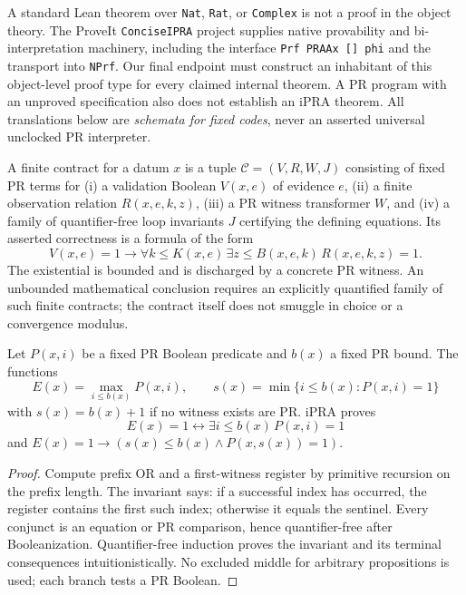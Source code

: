 \documentclass[11pt]{article}
\begin{document}
A standard Lean theorem over \texttt{Nat}, \texttt{Rat}, or \texttt{Complex} is not a proof in the object theory. The ProveIt \texttt{ConciseIPRA} project supplies native provability and bi-interpretation machinery, including the interface \texttt{Prf PRAAx [] phi} and the transport into \texttt{NPrf}. Our final endpoint must construct an inhabitant of this object-level proof type for every claimed internal theorem. A PR program with an unproved specification also does not establish an iPRA theorem. All translations below are \emph{schemata for fixed codes}, never an asserted universal unclocked PR interpreter.

\begin{definition}
A finite contract for a datum $x$ is a tuple $\mathcal C=(V,R,W,J)$ consisting of fixed PR terms for (i) a validation Boolean $V(x,e)$ of evidence $e$, (ii) a finite observation relation $R(x,e,k,z)$, (iii) a PR witness transformer $W$, and (iv) a family of quantifier-free loop invariants $J$ certifying the defining equations. Its asserted correctness is a formula of the form
\[V(x,e)=1\to \forall k\le K(x,e)\,\exists z\le B(x,e,k)\,R(x,e,k,z)=1.\]
The existential is bounded and is discharged by a concrete PR witness. An unbounded mathematical conclusion requires an explicitly quantified family of such finite contracts; the contract itself does not smuggle in choice or a convergence modulus.
\end{definition}

\begin{lemma}
Let $P(x,i)$ be a fixed PR Boolean predicate and $b(x)$ a fixed PR bound. The functions
\[E(x)=\max_{i\le b(x)}P(x,i),\qquad s(x)=\min\{i\le b(x):P(x,i)=1\}\]
with $s(x)=b(x)+1$ if no witness exists are PR. iPRA proves
\[E(x)=1\leftrightarrow\exists i\le b(x)\,P(x,i)=1\]
and $E(x)=1\to(s(x)\le b(x)\wedge P(x,s(x))=1)$.
\end{lemma}
\begin{proof}
Compute prefix OR and a first-witness register by primitive recursion on the prefix length. The invariant says: if a successful index has occurred, the register contains the first such index; otherwise it equals the sentinel. Every conjunct is an equation or PR comparison, hence quantifier-free after Booleanization. Quantifier-free induction proves the invariant and its terminal consequences intuitionistically. No excluded middle for arbitrary propositions is used; each branch tests a PR Boolean.
\end{proof}
\end{document}
